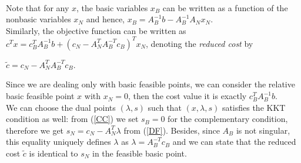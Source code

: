 \documentclass[a4paper,10 pt,titlepage,twoside]{book}
\theoremstyle{plain}
\theoremstyle{definition}
\theoremstyle{remark}
\begin{document}
 \\Note that for any $x$, the basic variables $x_{B}$ can be written as a function of the nonbasic variables $x_{N}$ and hence, $x_{B}=A_{B}^{-1}b-A_{B}^{-1}A_{N}x_{N}$. \\Similarly, the objective function can be written as $c^{T}x=c_{B}^{T}A_{B}^{-1}b+(c_{N}-A_{N}^{T}A_{B}^{-T}c_{B})^{T}x_{N}$, denoting the \textit{reduced cost} by \begin{center}
 	$\widetilde{c}=c_{N}-A_{N}^{T}A_{B}^{-T}c_{B}$.
 \end{center}Since we are dealing only with basic feasible points, we can consider the relative basic feasible point $x$ with $x_{N}= 0$, then the cost value it is exactly $c_{B}^{T}A_{B}^{-1}b$.\\
 We can choose the dual points $(\lambda,s)$ such that $(x, \lambda, s)$ satisfies the KKT condition as well: from (\ref{CC}) we set $s_{B}= 0$ for the complementary condition, therefore we get $s_{N}= c_{N}- A_{N}^{T}\lambda$ from (\ref{DF}). Besides, since $A_{B}$ is not singular, this equality uniquely defines $\lambda$ as $\lambda = A_{B}^{-T}c_{B}$ and we can state that the reduced cost $\tilde{c}$ is identical to $s_{N}$ in the feasible basic point.\\  
 
\end{document}
